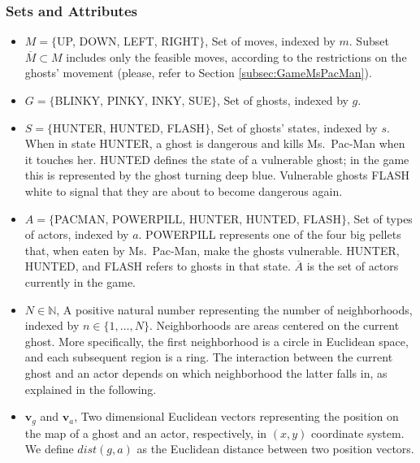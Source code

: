\documentclass[journal]{IEEEtran}
\begin{document}
\subsubsection{Sets and Attributes}
\begin{itemize}
  \item $M=\{$UP, DOWN, LEFT, RIGHT$\}$, Set of moves, indexed by $m$. Subset $\overline{M}\subset M$ includes only the feasible moves, according to the restrictions on the ghosts' movement (please, refer to Section \ref{subsec:GameMsPacMan}).
  \item $G=\{$BLINKY, PINKY, INKY, SUE$\}$, Set of ghosts, indexed by $g$.
  \item $S=\{$HUNTER, HUNTED, FLASH$\}$, Set of ghosts' states, indexed by $s$. When in state HUNTER, a ghost is dangerous and kills Ms.\  Pac-Man when it touches her. HUNTED defines the state of a vulnerable ghost; in the game this is represented by the ghost turning deep blue. Vulnerable ghosts FLASH white to signal that they are about to become dangerous again.
  \item $A=\{$PACMAN, POWERPILL, HUNTER, HUNTED, FLASH$\}$, Set of types of actors, indexed by $a$. POWERPILL represents one of the four big pellets that, when eaten by Ms.\  Pac-Man, make the ghosts vulnerable. HUNTER, HUNTED, and FLASH refers to ghosts in that state. $\overline{A}$ is the set of actors currently in the game.
  \item $N \in \mathbb{N}$, A positive natural number representing the number of neighborhoods, indexed by\textbf{ $n  \in \{1, \ldots, N\}$}. Neighborhoods are areas centered on the current ghost. More specifically, the first neighborhood is a circle in Euclidean space, and each subsequent region is a ring. The interaction between the current ghost and an actor depends on which neighborhood the latter falls in, as explained in the following.
  \item $\mathbf{v}_g$ and $\mathbf{v}_a$, Two dimensional Euclidean vectors representing the position on the map of a ghost and an actor, respectively, in $(x,y)$ coordinate system. We define $dist(g,a)$ as the Euclidean distance between two position vectors.
\end{itemize}
\end{document}
